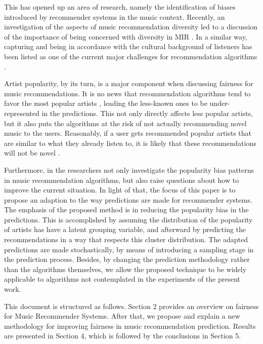\documentclass{article}
\begin{document}
This has opened up an area of research, namely the identification 
of biases introduced by recommender systems in the music context.
Recently, an investigation of the aspects of music recommendation diversity led to a discussion of the importance of being concerned with diversity in MIR \cite{recommendationdiversity}.
In a similar
way, capturing and being in accordance with the cultural 
background of listeners has been listed as one
of the current major challenges for 
recommendation algorithms \cite{challenge}. 

Artist popularity, by its turn, is a major component 
when discussing fairness for music recommendations.
It is no news that recommendation algorithms
tend to favor the most popular artists
\cite{celma2008hits, pap_unfairness}, leading
the less-known ones to be under-represented in the predictions. This not
only directly affects less popular artists, but it also
puts the algorithms at the risk of not actually
recommending novel music to the users. Reasonably, if a user
gets recommended popular artists that are similar
to what they already listen to, it is likely that
these recommendations will not be novel \cite{celma2008hits}.

Furthermore, in \cite{pap_unfairness} the researchers not
only investigate the popularity bias patterns in 
music recommendation algorithms, but also raise questions about
how to improve the current situation. In light of that, 
the focus of this paper is to propose an adaption
to the way predictions are made for recommender systems. The emphasis of the proposed method is in reducing the
popularity bias in the predictions. This is accomplished
by assuming the distribution of the popularity of artists
has have a latent grouping variable, and afterward by
predicting the recommendations in a way that
respects this cluster distribution. The adapted predictions
are made stochastically, by means of introducing 
a sampling stage in the prediction process. Besides, by 
changing the prediction methodology rather than the algorithms
themselves, we allow the proposed technique to be widely applicable
to algorithms not contemplated in the experiments of
the present work. 

This document is structured as follows. 
Section 2 provides an overview on
fairness for Music Recommender Systems. 
After that, we propose and explain a new methodology for improving fairness in music recommendation prediction. Results are presented in 
Section 4, which is followed by the conclusions 
in Section 5. 
\end{document}
